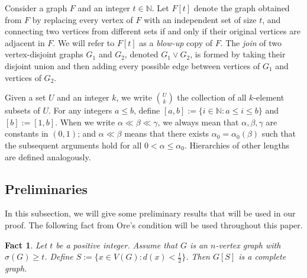 \documentclass[11pt, a4paper]{article}
\newtheorem{fact}[theorem]{Fact}
\theoremstyle{definition}
\newcommand{\<}{\subseteq}
\begin{document}

Consider a graph $F$ and an integer $t\in \mathbb{N}$. Let $F[t]$ denote the graph obtained from $F$ by replacing every vertex of $F$ 
 with an independent set of size $t$, and connecting two vertices from different sets if and only if their original vertices are adjacent in $F$. %
We will refer to $F[t]$ as a \textit{blow-up} copy of $F$. 
The \textit{join} of two vertex-disjoint graphs $G_1$ and $G_2$, denoted $G_1\vee G_2$, is formed by taking their disjoint union and then adding every possible edge between vertices of $G_1$ and vertices of $G_2$. 
 

Given a set $U$ 
and an integer $k$, we write
$\binom{U}{k}$ the collection of all 
$k$-element subsets of $U$. For any integers $a\leq b$, define $[a,b]:=\{i\in \mathbb{N}:a\leq i\leq b\}$ and $[b]:=[1,b]$. When we write  $\alpha\ll \beta\ll \gamma$, we always mean that $\alpha, \beta, \gamma$  are constants in $(0,1)$; and $\alpha\ll \beta$ means that there exists $\alpha_0=\alpha_0(\beta)$ such that the subsequent arguments hold for all $0<\alpha\leq \alpha_0$. Hierarchies of other lengths are defined analogously.

\subsection{Preliminaries}

In this subsection, we will give some preliminary results that will be used in our proof. The following fact from Ore's condition will be used throughout this paper. 

\begin{fact}\label{clique}
   Let $t$ be a positive integer. Assume that $G$ is an  $n$-vertex graph with $\sigma(G)\ge t$. Define $S:=\{x\in V(G): d(x)<\frac{t}{2}\}$. Then $G[S]$ is a complete graph.
\end{fact}
\end{document}
